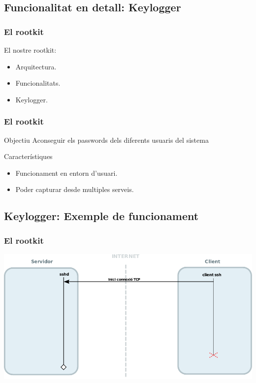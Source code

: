 \documentclass{beamer}
\begin{document}
\subsection{Funcionalitat en detall: Keylogger}

\begin{frame}
    \frametitle{El rootkit}
	\begin{block}{El nostre rootkit:}
		\begin{itemize}
			\item Arquitectura.
			\item Funcionalitats.
			\item \alert{Keylogger.}
		\end{itemize}
	\end{block}
\end{frame}

\begin{frame}
	\frametitle{El rootkit}
	\begin{block}{Objectiu}
		Aconseguir els passwords dels diferents usuaris del sistema
	\end{block}
	\begin{block}{Característiques}
		\begin{itemize}
			\item Funcionament en entorn d'usuari.
			\item Poder capturar desde multiples serveis.
		\end{itemize}
	\end{block}
\end{frame}

\subsection*{Keylogger: Exemple de funcionament}
\begin{frame}
	\frametitle{El rootkit}
	\includegraphics[scale=0.65,keepaspectratio]{sshd_1.pdf}
\end{frame}
\end{document}
